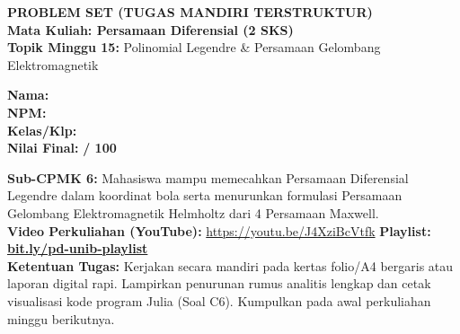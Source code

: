 \documentclass[10pt,a4paper]{article}
\begin{document}
\noindent\begin{minipage}[c]{0.68\textwidth}%
  {\large\textbf{\color{unibblue}PROBLEM SET (TUGAS MANDIRI TERSTRUKTUR)}}\\[1mm]
  {\normalsize\textbf{Mata Kuliah: Persamaan Diferensial (2 SKS)}}\\[0.5mm]
  {\small\textbf{Topik Minggu 15:} Polinomial Legendre \& Persamaan Gelombang Elektromagnetik}%
\end{minipage}%
\hfill%
\begin{minipage}[c]{0.30\textwidth}%
  \begin{tcolorbox}[colback=unibblue!5,colframe=unibblue,boxrule=0.6pt,arc=2pt,left=4pt,right=4pt,top=2pt,bottom=2pt]
    \scriptsize
    \textbf{Nama:} \dotfill\\[1.2mm]
    \textbf{NPM:} \dotfill\\[1.2mm]
    \textbf{Kelas/Klp:} \dotfill\\[1.2mm]
    \textbf{Nilai Final:} \hfill \textbf{/ 100}
  \end{tcolorbox}%
\end{minipage}\par

\vspace{1.5mm}

\begin{tcolorbox}[colback=boxbg,colframe=unibgold!90!black,boxrule=0.6pt,arc=2pt,left=5pt,right=5pt,top=3pt,bottom=3pt,title=\textbf{\scriptsize Capaian Pembelajaran (Sub-CPMK 6) \& Pedoman Pengerjaan Tugas}]
  \scriptsize
  \textbf{Sub-CPMK 6:} Mahasiswa mampu memecahkan Persamaan Diferensial Legendre dalam koordinat bola serta menurunkan formulasi Persamaan Gelombang Elektromagnetik Helmholtz dari 4 Persamaan Maxwell.\\
  \textbf{Video Perkuliahan (YouTube):} \url{https://youtu.be/J4XziBcVtfk} \hfill \textbf{Playlist:} \href{https://www.youtube.com/playlist?list=PLS5oOZWXZeTw}{\color{unibblue}\textbf{bit.ly/pd-unib-playlist}}\\\textbf{Ketentuan Tugas:} Kerjakan secara mandiri pada kertas folio/A4 bergaris atau laporan digital rapi. Lampirkan penurunan rumus analitis lengkap dan cetak visualisasi kode program Julia (Soal C6). Kumpulkan pada awal perkuliahan minggu berikutnya.
\end{tcolorbox}

\vspace{1.5mm}
\end{document}
